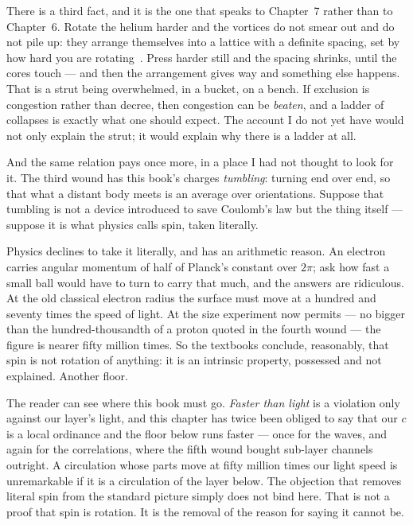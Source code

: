 \documentclass[fontsize=11pt,paper=a4,pagesize=auto,parskip=half-]{scrbook}
\begin{document}
There is a third fact, and it is the one that speaks to Chapter~7 rather than to Chapter~6. Rotate the helium harder and the vortices do not smear out and do not pile up: they arrange themselves into a lattice with a definite spacing, set by how hard you are rotating~\cite{feynman1955}. Press harder still and the spacing shrinks, until the cores touch --- and then the arrangement gives way and something else happens. That is a strut being overwhelmed, in a bucket, on a bench. If exclusion is congestion rather than decree, then congestion can be \emph{beaten}, and a ladder of collapses is exactly what one should expect. The account I do not yet have would not only explain the strut; it would explain why there is a ladder at all.

And the same relation pays once more, in a place I had not thought to look for it. The third wound has this book's charges \emph{tumbling}: turning end over end, so that what a distant body meets is an average over orientations. Suppose that tumbling is not a device introduced to save Coulomb's law but the thing itself --- suppose it is what physics calls spin, taken literally.

Physics declines to take it literally, and has an arithmetic reason. An electron carries angular momentum of half of Planck's constant over $2\pi$; ask how fast a small ball would have to turn to carry that much, and the answers are ridiculous. At the old classical electron radius the surface must move at a hundred and seventy times the speed of light. At the size experiment now permits --- no bigger than the hundred-thousandth of a proton quoted in the fourth wound --- the figure is nearer fifty million times. So the textbooks conclude, reasonably, that spin is not rotation of anything: it is an intrinsic property, possessed and not explained. Another floor.

The reader can see where this book must go. \emph{Faster than light} is a violation only against our layer's light, and this chapter has twice been obliged to say that our $c$ is a local ordinance and the floor below runs faster --- once for the waves, and again for the correlations, where the fifth wound bought sub-layer channels outright. A circulation whose parts move at fifty million times our light speed is unremarkable if it is a circulation of the layer below. The objection that removes literal spin from the standard picture simply does not bind here. That is not a proof that spin is rotation. It is the removal of the reason for saying it cannot be.
\end{document}
